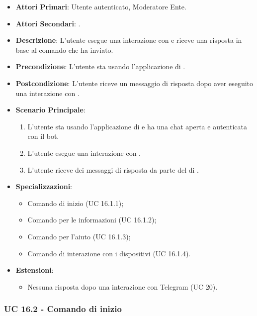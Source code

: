 	\begin{itemize}
		\item \textbf{Attori Primari}: Utente autenticato, Moderatore Ente.
		\item \textbf{Attori Secondari}: .
		\item \textbf{Descrizione}: L'utente esegue una interazione con  e riceve una risposta in base al comando che ha inviato. 
		\item \textbf{Precondizione}: L'utente sta usando l'applicazione di .
		\item \textbf{Postcondizione}: L'utente riceve un messaggio di risposta dopo aver eseguito una interazione con .
		\item \textbf{Scenario Principale}:
		\begin{enumerate}
			\item L'utente sta usando l'applicazione di  e ha una chat aperta e autenticata con il bot. 
			\item L'utente esegue una interazione con .
			\item L'utente riceve dei messaggi di risposta da parte del  di .
		\end{enumerate}
		\item \textbf{Specializzazioni}:
		\begin{itemize}
			\item Comando di inizio (UC 16.1.1);
			\item Comando per le informazioni (UC 16.1.2);
			\item Comando per l'aiuto (UC 16.1.3);
			\item Comando di interazione con i dispositivi (UC 16.1.4).
		\end{itemize}
		\item \textbf{Estensioni}:
		\begin{itemize}
			\item Nessuna risposta dopo una interazione con Telegram (UC 20).
		\end{itemize}
	\end{itemize}

	\subsubsection{UC 16.2 - Comando di inizio}

